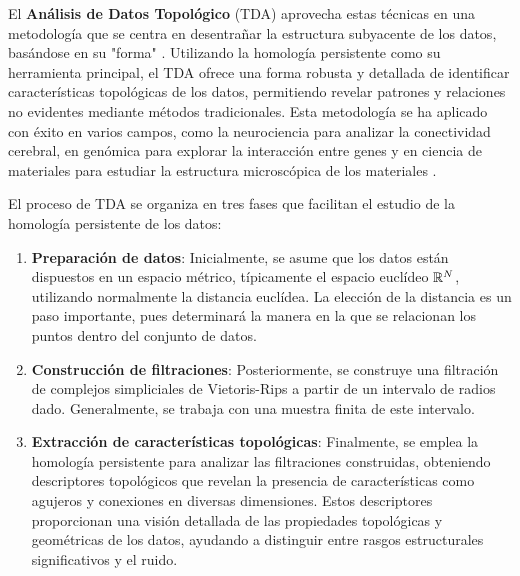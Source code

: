 El \textbf{Análisis de Datos Topológico} (TDA) aprovecha estas técnicas en una metodología que se centra en desentrañar la estructura subyacente de los datos, basándose en su "forma" \cite{carlsson2009topology}. Utilizando la homología persistente como su herramienta principal, el TDA ofrece una forma robusta y detallada de identificar características topológicas de los datos, permitiendo revelar patrones y relaciones no evidentes mediante métodos tradicionales. Esta metodología se ha aplicado con éxito en varios campos, como la neurociencia para analizar la conectividad cerebral, en genómica para explorar la interacción entre genes y en ciencia de materiales para estudiar la estructura microscópica de los materiales \cite{10.3389/frai.2021.667963}.

El proceso de TDA se organiza en tres fases que facilitan el estudio de la homología persistente de los datos:

\begin{enumerate}
	\item \textbf{Preparación de datos}: Inicialmente, se asume que los datos están dispuestos en un espacio métrico, típicamente el espacio euclídeo $\mathbb{R}^N$, utilizando normalmente la distancia euclídea. La elección de la distancia es un paso importante, pues determinará la manera en la que se relacionan los puntos dentro del conjunto de datos.
	
	\item \textbf{Construcción de filtraciones}: Posteriormente, se construye una filtración de complejos simpliciales de Vietoris-Rips a partir de un intervalo de radios dado. Generalmente, se trabaja con una muestra finita de este intervalo.
	
	\item \textbf{Extracción de características topológicas}: Finalmente, se emplea la homología persistente para analizar las filtraciones construidas, obteniendo descriptores topológicos que revelan la presencia de características como agujeros y conexiones en diversas dimensiones. Estos descriptores proporcionan una visión detallada de las propiedades topológicas y geométricas de los datos, ayudando a distinguir entre rasgos estructurales significativos y el ruido.
\end{enumerate}


